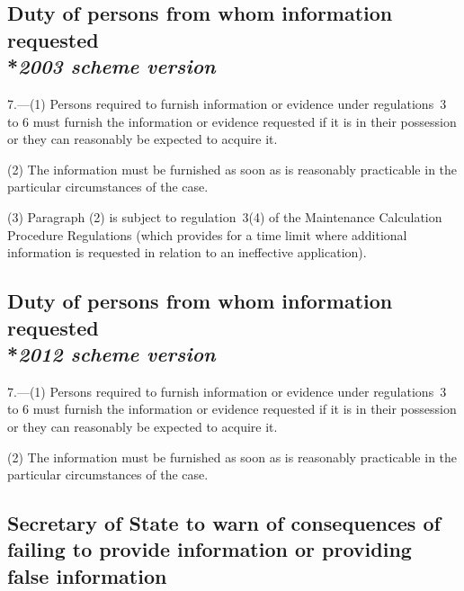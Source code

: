 \documentclass[12pt,a4paper]{article}
\begin{document}
\subsection[7. Duty of persons from whom information requested --- \emph{2003 scheme version}]{Duty of persons from whom information requested\\*\emph{2003 scheme version}}

7.---(1)  Persons required to furnish information or evidence under regulations~3 to 6 must furnish the information or evidence requested if it is in their possession or they can reasonably be expected to acquire it.

(2) The information must be furnished as soon as is reasonably practicable in the particular circumstances of the case.

(3) Paragraph (2) is subject to regulation~3(4) of the Maintenance Calculation Procedure Regulations (which provides for a time limit where additional information is requested in relation to an ineffective application).

\subsection[7. Duty of persons from whom information requested --- \emph{2012 scheme version}]{Duty of persons from whom information requested\\*\emph{2012 scheme version}}

7.---(1)  Persons required to furnish information or evidence under regulations~3 to 6 must furnish the information or evidence requested if it is in their possession or they can reasonably be expected to acquire it.

(2) The information must be furnished as soon as is reasonably practicable in the particular circumstances of the case.



\subsection[8. 
Secretary of State  %
to warn of consequences of failing to provide information or providing false information]{%
Secretary of State  %
to warn of consequences of failing to provide information or providing false information}
\end{document}
